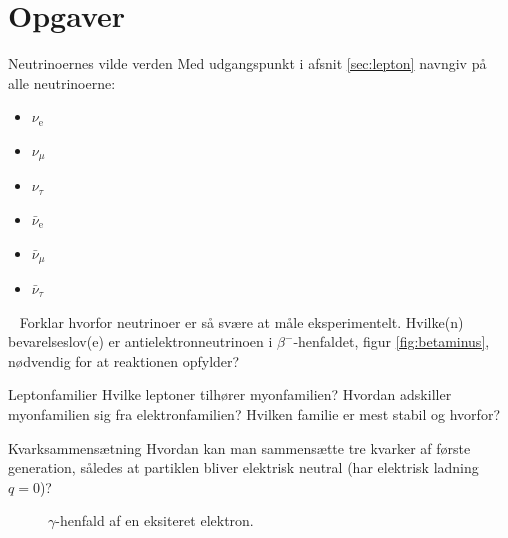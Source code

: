 \section{Opgaver}
\begin{opgave}{Neutrinoernes vilde verden}
    Med udgangspunkt i afsnit \ref{sec:lepton} navngiv på alle neutrinoerne:
    \begin{itemize}
        \item $\nu_\mathrm{e}$
        \item $\nu_\mu$
        \item $\nu_\tau$
        \item $\bar{\nu}_\mathrm{e}$
        \item $\bar{\nu}_\mu$
        \item $\bar{\nu}_\tau$
    \end{itemize}
    ~
    \opg Forklar hvorfor neutrinoer er så svære at måle eksperimentelt.
    \opg Hvilke(n) bevarelseslov(e) er antielektronneutrinoen i $\beta^-$-henfaldet, figur \ref{fig:betaminus}, nødvendig for at reaktionen opfylder?
\end{opgave}

\begin{opgave}{Leptonfamilier}
    \opg Hvilke leptoner tilhører myonfamilien?
    \opg Hvordan adskiller myonfamilien sig fra elektronfamilien?
    \opg Hvilken familie er mest stabil og hvorfor?
\end{opgave}

\begin{opgave}{Kvarksammensætning}
    Hvordan kan man sammensætte tre kvarker af første generation, således at partiklen bliver elektrisk neutral (har elektrisk ladning $q=0$)?
\end{opgave}

\begin{figure}
    \centering
    \caption{$\gamma$-henfald af en eksiteret elektron.}
    \label{fig:gamma}
\end{figure}


